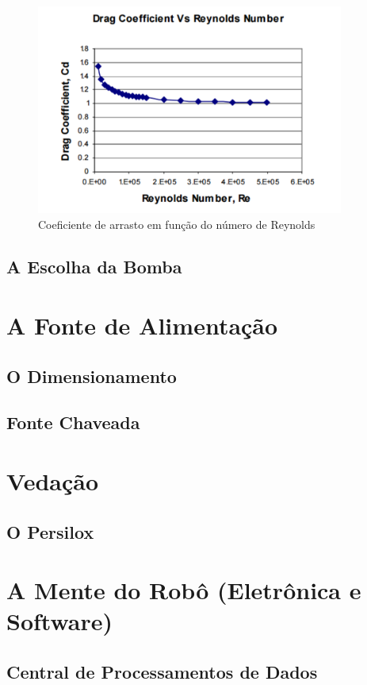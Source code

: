 \begin{figure}[h]
  \centering
  \includegraphics[width=0.9\textwidth]{figures/graphic-reynolds.png}
  \caption{Coeficiente de arrasto em função do número de Reynolds \cite{eng2008}}
  \label{fig:graphic-reynolds}
\end{figure}
\FloatBarrier
\par
[APLICANDO A EQ 1.......]

    \subsection{A Escolha da Bomba}
  \section{A Fonte de Alimentação}
    \subsection{O Dimensionamento}
    \subsection{Fonte Chaveada}
  \section{Vedação}
    \subsection{O Persilox}
  \section{A Mente do Robô (Eletrônica e Software)}
    \subsection{Central de Processamentos de Dados}

